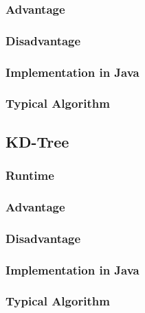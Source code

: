 \documentclass[12pt,a4paper]{article}
\newcommand{\RuntimeHead}{Runtime}
\newcommand{\AdvantageHead}{Advantage}
\newcommand{\DisadvantageHead}{Disadvantage}
\newcommand{\ImplementationInJavaHead}{Implementation in Java}
\newcommand{\TypicalAlgorithmHead}{Typical Algorithm}
\begin{document}
\subsubsection{\AdvantageHead}
\subsubsection{\DisadvantageHead}
\subsubsection{\ImplementationInJavaHead}
\subsubsection{\TypicalAlgorithmHead}

\subsection{KD-Tree}
\subsubsection{\RuntimeHead}
\subsubsection{\AdvantageHead}
\subsubsection{\DisadvantageHead}
\subsubsection{\ImplementationInJavaHead}
\subsubsection{\TypicalAlgorithmHead}
\end{document}
